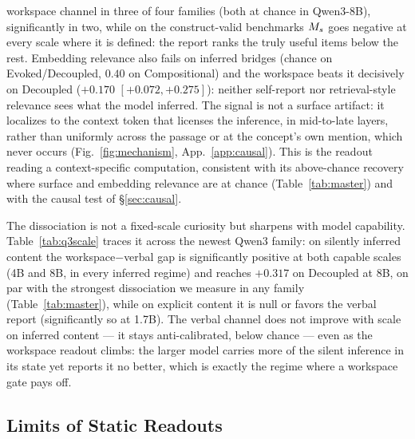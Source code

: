 workspace channel in three of four families (both at chance in Qwen3-8B),
significantly in two, while on the
construct-valid benchmarks $M_s$ goes negative at every scale where it is
defined: the report ranks the truly useful items below the rest. Embedding
relevance also fails on inferred bridges
(chance on Evoked/Decoupled, $0.40$ on Compositional) and the workspace beats it decisively on Decoupled
($+0.170$ $[+0.072, +0.275]$): neither self-report nor retrieval-style relevance
sees what the model inferred.
The signal is not a surface artifact: it localizes to the context token that
licenses the inference, in mid-to-late layers, rather than uniformly across
the passage or at the concept's own mention, which never occurs
(Fig.~\ref{fig:mechanism}, App.~\ref{app:causal}). This is the readout reading
a context-specific computation, consistent with its above-chance recovery
where surface and embedding relevance are at chance (Table~\ref{tab:master})
and with the causal test of \S\ref{sec:causal}.

The dissociation is not a fixed-scale curiosity but sharpens with model
capability. Table~\ref{tab:q3scale} traces it across the newest Qwen3 family:
on silently inferred content the workspace$-$verbal gap is significantly
positive at both capable scales (4B and 8B, in every inferred regime) and
reaches $+0.317$ on Decoupled at 8B, on par with the strongest dissociation we
measure in any family (Table~\ref{tab:master}),
while on explicit content it is null or favors the verbal report (significantly
so at 1.7B). The verbal channel does not improve with scale on inferred content
--- it stays anti-calibrated, below chance --- even as the workspace readout
climbs: the larger model carries more of the silent inference in its state yet
reports it no better, which is exactly the regime where a workspace gate pays
off.



\subsection{Limits of Static Readouts}
\label{sec:boundary}

